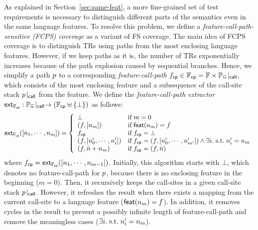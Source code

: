 As explained in Section~\ref{sec:same-feat}, a more fine-grained set of test
requirements is necessary to distinguish different parts of the semantics even
in the same language features.
%
To resolve this problem, we define a \textit{feature-call-path-sensitive (FCPS)
coverage} as a variant of FS coverage.
%
The main idea of FCPS coverage is to distinguish TRs using paths from the most
enclosing language features.
%
However, if we keep paths as it is, the number of TRs exponentially increases
because of the path explosion caused by sequential branches.
%
Hence, we simplify a path $p$ to a corresponding \textit{feature-call-path}
$f_{\textsf{cp}} \in \mathbb{F}_{\textsf{cp}} = \mathbb{F} \times {\mathbb{P}_{\mathbb{G}}}\!\mid_{\textsf{call}}$, which consists of
the most enclosing feature and a subsequence of the call-site stack
${p}\!\mid_{\textsf{call}}$ from the feature.
%
We define the \textit{feature-call-path extractor} $\textsf{ext}_{\mathbb{F}_{\textsf{cp}}}:
{\mathbb{P}_{\mathbb{G}}}\!\mid_{\textsf{call}} \rightarrow (\mathbb{F}_{\textsf{cp}} \uplus \{ \bot \})$ as follows:
%
\begin{equation}\label{equ:extfcp}
  \textsf{ext}_{\mathbb{F}_{\textsf{cp}}}([n_1, \cdots, n_m]) = \left\{
    \begin{array}{ll}
      \bot & \text{if} \; m = 0\\

      (f, [n_m]) & \text{if} \; \textsf{feat}(n_m) = f\\

      f_{\textsf{cp}} & \text{if} \; f_{\textsf{cp}} = \bot\\

      (f, [n'_0, \cdots, n'_i]) &
      \text{if} \; f_{\textsf{cp}} = (f, [n'_0, \cdots, n'_{m'}]) \wedge
      \exists i. {\; \text{s.t.} \; } n'_i = n_m\\

      (f, \bar{n} + n_m) & \text{if} \; f_{\textsf{cp}} = (f, \bar{n})\\
    \end{array}
  \right.
\end{equation}
%
where $f_{\textsf{cp}} = \textsf{ext}_{\mathbb{F}_{\textsf{cp}}}([n_1, \cdots, n_{m-1}])$.
%
Initially, this algorithm starts with $\bot$, which denotes no feature-call-path
for $p$, because there is no enclosing feature in the beginning ($m = 0$).
%
Then, it recursively keeps the call-sites in a given call-site
stack ${p}\!\mid_{\textsf{call}}$.
%
However, it refreshes the result when there exists a mapping from the current
call-site to a language feature ($\textsf{feat}(n_m) = f$).
%
In addition, it removes cycles in the result to prevent a possibly infinite
length of feature-call-path and remove the meaningless cases ($\exists i. {\; \text{s.t.} \; }
n'_i = n_m$).

